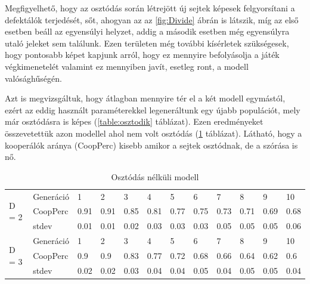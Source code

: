 Megfigyelhető, hogy az osztódás során létrejött új sejtek képesek felgyorsítani a defektálók terjedését, sőt, ahogyan az az \ref{fig:Divide} ábrán is látszik, míg az első esetben beáll az egyensúlyi helyzet, addig a második esetben még egyensúlyra utaló jeleket sem találunk. Ezen területen még további kísérletek szükségesek, hogy pontosabb képet kapjunk arról, hogy ez mennyire befolyásolja a játék végkimenetelét valamint ez mennyiben javít, esetleg ront, a modell valósághűségén.

Azt is megvizsgáltuk, hogy átlagban mennyire tér el a két modell egymástól, ezért az eddig használt paraméterekkel legeneráltunk egy újabb populációt, mely már osztódásra is képes (\ref{table:osztodik} táblázat). Ezen eredményeket összevetettük azon modellel ahol nem volt osztódás (\ref{table:nemOsztodik} táblázat). Látható, hogy a kooperálók aránya (CoopPerc) kisebb amikor a sejtek osztódnak, de a szórása is nő.

\begin{table}[htb]
	\centering
	\begin{tabular}{ | l | l | l | l | l | l | l | l | l | l | l | l | }
		\hline
		\multirow{3}{*}{D = 2}
		& Generáció & 1 & 2 & 3 & 4 & 5 & 6 & 7 & 8 & 9 & 10 \\ \cline{2-12}
		& CoopPerc & 0.91 & 0.91 & 0.85 & 0.81 & 0.77 & 0.75 & 0.73 & 0.71 & 0.69 & 0.68 \\ \cline{2-12}
		& stdev & 0.01 & 0.01 & 0.02 & 0.03 & 0.03 & 0.03 & 0.05 & 0.05 & 0.05 & 0.06 \\ \hline
		\multirow{3}{*}{D = 3}
		& Generáció & 1 & 2 & 3 & 4 & 5 & 6 & 7 & 8 & 9 & 10 \\ \cline{2-12}
		& CoopPerc & 0.9 & 0.9 & 0.83 & 0.77 & 0.72 & 0.68 & 0.66 & 0.64 & 0.62 & 0.6 \\ \cline{2-12}
		& stdev & 0.02 & 0.02 & 0.03 & 0.04 & 0.04 & 0.05 & 0.04 & 0.05 & 0.05 & 0.04 \\ \hline
	\end{tabular}
	\vspace*{1mm}
	\caption{Osztódás nélküli modell}
	\label{table:nemOsztodik}
\end{table}

